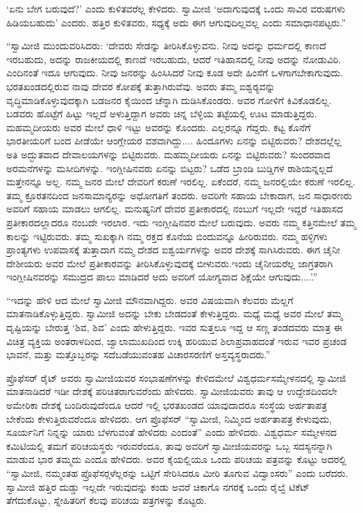  ‘ಏನು ಬೇಗ ಬರುವುದೆ?’ ಎಂದು ಕುಳಿತವರೆಲ್ಲ ಕೇಳಿದರು. ಸ್ವಾಮೀಜಿ ‘ಅದಾಗುವುದಕ್ಕೆ ಒಂದು ಸಾವಿರ ವರುಷಗಳು ಹಿಡಿಯಬಹುದು’ ಎಂದರು. ಹತ್ತಿರ ಕುಳಿತವರು, ಸಧ್ಯಕ್ಕೆ ಅದು ಈಗ ಆಗುವುದಿಲ್ಲವಲ್ಲ ಎಂದು ಸಮಾಧಾನಪಟ್ಟರು.” 

 “ಸ್ವಾಮೀಜಿ ಮುಂದುವರಿಸಿದರು: ‘ದೇವರು ಸೇಡನ್ನು ತೀರಿಸಿಕೊಳ್ಳುವನು. ನೀವು ಅದನ್ನು ಧರ್ಮದಲ್ಲಿ ಕಾಣದೆ ಇರಬಹುದು, ಅದನ್ನು ರಾಜಕೀಯದಲ್ಲಿ ಕಾಣದೆ ಇರಬಹುದು, ಆದರೆ ಇತಿಹಾಸದಲ್ಲಿ ನೀವು ಅದನ್ನು ನೋಡುವಿರಿ. ಎಂದಿನಂತೆ ಇದೂ ಆಗುವುದು. ನೀವು ಜನರನ್ನು ಹಿಂಸಿಸಿದರೆ ನೀವು ಕೂಡ ಅದೇ ಹಿಂಸೆಗೆ ಒಳಗಾಗಬೇಕಾಗುವುದು. ಭರತಖಂಡದಲ್ಲಿರುವ ನಾವು ದೇವರ ಕೋಪಕ್ಕೆ ತುತ್ತಾಗಿರುವೆವು. ಅವರು ತಮ್ಮ ಐಶ್ವರ‍್ಯವನ್ನು ವೃದ್ಧಿಮಾಡಿಕೊಳ್ಳುವುದಕ್ಕಾಗಿ ಬಡಜನರ ಕೈಯಿಂದ ಚೆನ್ನಾಗಿ ದುಡಿಸಿಕೊಂಡರು. ಅವರ ಗೋಳಿಗೆ ಕಿವಿಕೊಡಲಿಲ್ಲ. ಬಡವರು ಹೊಟ್ಟೆಗೆ ಹಿಟ್ಟು ಇಲ್ಲದೆ ಅಳುತ್ತಿದ್ದಾಗ ಅವರು ಚಿನ್ನ ಬೆಳ್ಳಿಯ ತಟ್ಟೆಯಲ್ಲಿ ಊಟ ಮಾಡುತ್ತಿದ್ದರು. ಮಹಮ್ಮದೀಯರು ಅವರ ಮೇಲೆ ಧಾಳಿ ಇಟ್ಟು ಅವರನ್ನು ಕೊಂದರು. ಎಲ್ಲರನ್ನೂ ಗೆದ್ದರು. ಕಟ್ಟ ಕೊನೆಗೆ ಭಾರತೀಯರಿಗೆ ಬಂದ ಪೀಡೆಯೇ ಆಂಗ್ಲೇಯರ ವಶವಾಗಿದ್ದು.... ಹಿಂದೂಗಳು ಏನನ್ನು ಬಿಟ್ಟಿರುವರು? ದೇಶದಲ್ಲೆಲ್ಲ ಅತಿ ಅದ್ಭುತವಾದ ದೇವಾಲಯಗಳನ್ನು ಬಿಟ್ಟಿರುವರು. ಮಹಮ್ಮದೀಯರು ಏನನ್ನು ಬಿಟ್ಟಿರುವರು? ಸುಂದರವಾದ ಅರಮನೆಗಳನ್ನು ಮಸೀದಿಗಳನ್ನು. ಇಂಗ್ಲೀಷಿನವರು ಏನನ್ನು ಬಿಟ್ಟರು? ಒಡೆದ ಬ್ರಾಂಡಿ ಬುಡ್ಡಿಗಳ ರಾಶಿಯನ್ನಲ್ಲದೆ ಮತ್ತೇನನ್ನೂ ಅಲ್ಲ. ನಮ್ಮ ಜನರ ಮೇಲೆ ದೇವರಿಗೆ ಕರುಣೆ ಇರಲಿಲ್ಲ. ಏಕೆಂದರೆ, ನಮ್ಮ ಜನರಲ್ಲಿಯೇ ಕರುಣೆ ಇರಲಿಲ್ಲ. ತಮ್ಮ ಕ್ರೂರತನದಿಂದ ಜನಸಾಮಾನ್ಯರನ್ನು ಅಧೋಗತಿಗೆ ತಂದರು. ಅವರಿಗೇ ಸಹಾಯ ಬೇಕಾದಾಗ, ಜನ ಸಾಧಾರಣರು ಅವರಿಗೆ ಸಹಾಯ ಮಾಡಲು ಆಗಲಿಲ್ಲ. ಮನುಷ್ಯನಿಗೆ ದೇವರ ಪ್ರತೀಕಾರದಲ್ಲಿ ನಂಬುಗೆ ಇಲ್ಲದೇ ಇದ್ದರೆ ಇತಿಹಾಸದ ಪ್ರತೀಕಾರದಲ್ಲಾದರೂ ನಂಬದೇ ಇರಲಾರ. ಇದು ಇಂಗ್ಲೀಷಿನವರ ಮೇಲೆ ಬರುವುದು. ಅವರು ನಮ್ಮ ಕತ್ತಿನಮೇಲೆ ತಮ್ಮ ಕಾಲನ್ನು ಇಟ್ಟಿರುವರು. ತಮ್ಮ ಸುಖಕ್ಕಾಗಿ ನಮ್ಮ ರಕ್ತದ ಕೊನೆಯ ಬಿಂದುವನ್ನೂ ಹೀರಿರುವರು. ನಮ್ಮ ಹಳ್ಳಿಗಳು ಪ್ರಾಂತ್ಯಗಳು ಉಪವಾಸಕ್ಕೆ ತುತ್ತಾದಾಗ ನಮ್ಮ ದೇಶದ ಐಶ್ವರ್ಯಗಳನ್ನು ಅವರ ದೇಶಕ್ಕೆ ಸಾಗಿಸಿರುವರು. ಈಗ ಚೈನೀ ದೇಶೀಯರು ಅವರ ಮೇಲೆ ಪ್ರತೀಕಾರವನ್ನು ತೀರಿಸಿಕೊಳ್ಳುವುದಕ್ಕೆ ಬೀಳುವರು.\break ಇಂದು ಚೈನೀಯರೆಲ್ಲ ಜಾಗ್ರತರಾಗಿ ಇಂಗ್ಲೀಷಿನವರನ್ನು ಸಮುದ್ರದ ಪಾಲು ಮಾಡಿದರೆ ಅದು ಅವರಿಗೆ ಯೋಗ್ಯವಾದ ಶಿಕ್ಷೆಯೇ ಆಗುವುದು....’.” 

 “ಇದನ್ನು ಹೇಳಿ ಆದ ಮೇಲೆ ಸ್ವಾಮೀಜಿ ಮೌನವಾಗಿದ್ದರು. ಅವರ ವಿಷಯವಾಗಿ ಕೆಲವರು ಮೆಲ್ಲಗೆ ಮಾತನಾಡಿಕೊಳ್ಳುತ್ತಿದ್ದರು. ಸ್ವಾಮೀಜಿ ಅದನ್ನು ಬೇಕು ಬೇಡದಂತೆ ಕೇಳುತ್ತಿದ್ದರು. ಮಧ್ಯೆ ಮಧ್ಯೆ ಅವರ ಮೇಲೆ ತಮ್ಮ ದೃಷ್ಟಿಯನ್ನು ಬೇರುತ್ತ ‘ಶಿವ, ಶಿವ’ ಎಂದು ಹೇಳುತ್ತಿದ್ದರು. ಇವರ ಸುತ್ತಲೂ ಇದ್ದ ಆ ಸಣ್ಣ ತಂಡದವರು ಮಾತ್ರ ಈ ವಿಚಿತ್ರ ವ್ಯಕ್ತಿಯ ಅಂತರಾಳದಿಂದ, ಜ್ವಾಲಾಮುಖದಿಂದ ಉಕ್ಕಿ ಹರಿಯುವ ಶಿಲಾಪ್ರವಾಹದಂತೆ ಇರುವ ಇವರ ಪ್ರಚಂಡ ಭಾವನೆ, ಮತ್ತು ಮತ್ತೊಬ್ಬರನ್ನು ಸದೆಬಡೆಯುವಂತಹ ವಿಚಾರಸರಣಿಗೆ ಅಸ್ತವ್ಯಸ್ಥರಾದರು.” 

 ಪ್ರೊಫೆಸರ್ ರೈಟ್ ಅವರು ಸ್ವಾಮೀಜಿಯವರ ಸಂಭಾಷಣೆಗಳನ್ನು ಕೇಳಿದಮೇಲೆ ವಿಶ್ವಧರ್ಮಸಮ್ಮೇಳನದಲ್ಲಿ ಸ್ವಾಮೀಜಿ ಮಾತನಾಡಿದರೆ ಇಡೀ ದೇಶಕ್ಕೆ ಪರಿಚಿತರಾಗುವರೆಂದು ಹೇಳಿದರು. ಸ್ವಾಮೀಜಿಯವರು ತಾವು ಆ ಉದ್ದೇಶದಿಂದಲೇ ಅಮೇರಿಕಾ ದೇಶಕ್ಕೆ ಬಂದಿರುವುದೆಂದೂ ಆದರೆ ಇಲ್ಲಿ ಭರತಖಂಡದ ಯಾವುದಾದರೂ ಸಂಸ್ಥೆಯ ಅರ್ಹತಾಪತ್ರ ಬೇಕೆಂದು ಕೇಳುತ್ತಿರುವರೆಂದೂ ಹೇಳಿದರು. ಆಗ ಪ್ರೊಫೆಸರ್ “ಸ್ವಾಮೀಜಿ, ನಿಮ್ಮಿಂದ ಅರ್ಹತಾಪತ್ರ ಕೇಳುವುದು, ಸೂರ್ಯನಿಗೆ ನಿನ್ನನ್ನು ಯಾರು ಬೆಳಗುವಂತೆ ಹೇಳಿದರು ಎಂದಂತೆ” ಎಂದು ಹೇಳಿದರು. ವಿಶ್ವಧರ್ಮ ಸಮ್ಮೇಳನದ ಕಮಿಟಿಯಲ್ಲಿ ತಮಗೆ ಪರಿಚಯಸ್ಥರು ಇರುವರೆಂದೂ, ತಾವು ಅವರಿಗೆ ಸ್ವಾಮೀಜಿಯವರನ್ನು ಒಬ್ಬ ಸದಸ್ಯನನ್ನಾಗಿ ಮಾಡುವ ಭಾರ ತಮ್ಮದು ಎಂದೂ ಹೇಳಿದರು. ಅವರ ಕೈಯಲ್ಲಿಯೂ ಒಂದು ಪರಿಚಯ ಪತ್ರವನ್ನು ಕೊಟ್ಟು ಅದರಲ್ಲಿ “ಸ್ವಾಮೀಜಿ, ನಮ್ಮಂತಹ ಪ್ರೊಫೆಸರ್‍ಗಳೆಲ್ಲರನ್ನು ಒಟ್ಟಿಗೆ ಸೇರಿಸಿದರೂ ಮೀರಿ ತೂಗುವ ವಿದ್ವಾಂಸರು” ಎಂದು ಬರೆದರು. ಸ್ವಾಮೀಜಿ ಹತ್ತಿರ ದುಡ್ಡು ಇಲ್ಲದೇ ಇರುವುದನ್ನು ಕಂಡು ಅವರೆ ಚಿಕಾಗೊ ನಗರಕ್ಕೆ ಒಂದು ರೈಲ್ವೆ ಟಿಕೆಟ್ ತೆಗೆದುಕೊಟ್ಟು, ಸ್ನೇಹಿತರಿಗೆ ಕೆಲವು ಪರಿಚಯ ಪತ್ರಗಳನ್ನು ಕೊಟ್ಟರು. 


